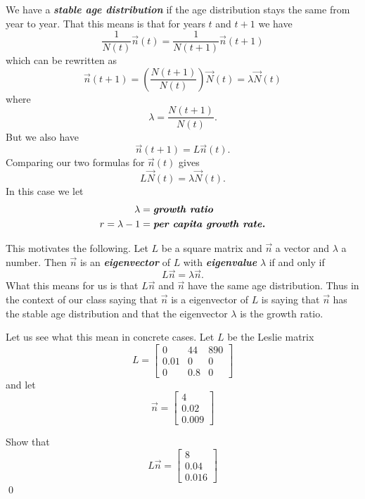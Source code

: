 \documentclass[11pt]{amsart}
\newcommand{\bi}[1]{{\bf\itshape #1\/}}  %
\renewcommand{\(}{\left(}
\renewcommand{\)}{\right)}
\renewcommand{\[}{\left[}
\renewcommand{\]}{\right]}
\theoremstyle{definition}
\theoremstyle{remark}
\newcounter{ProbCount}
\newcommand{\prob}{\stepcounter{ProbCount}
{\noindent{\bf \arabic{ProbCount}.} }}
\begin{document}
We have a \bi{stable age distribution} if the age distribution stays the same from year to year.  
That this means is that for years $t$ and $t+1$ we have
$$
\frac{1}{N(t)}\vec n(t)=
\frac{1}{N(t+1)}\vec n(t+1)
$$
which can be rewritten as
$$
\vec n(t+1)= \(\frac{N(t+1)}{N(t)}\)\vec N(t)=\lambda \vec N(t)
$$
where
$$
\lambda = \frac{N(t+1)}{N(t)}.
$$
But we also have
$$
\vec  n(t+1) = L \vec n(t).
$$
Comparing our two formulas for $\vec n(t)$ gives
$$
L \vec N(t) = \lambda \vec N(t).
$$
In this case we let
\begin{align*}
	\lambda&= \text{\bi{growth ratio}}\\
	r = \lambda-1 & = \text{\bi{per capita growth rate.}}
\end{align*}
\bigskip

This motivates the following.
Let $L$ be a square matrix and $\vec n$ a vector and $\lambda$ a number.  Then $\vec n$ is
an \bi{eigenvector} of $L$ with \bi{eigenvalue} $\lambda$ if and only 
if 
$$
L \vec n = \lambda \vec n.
$$
What this means for us is that $L \vec n$ and $\vec n$ have the same age distribution.
Thus in the context of our class saying that $\vec n$ is a eigenvector of $L$ is
saying that $\vec n$ has the stable age distribution and that the eigenvector $\lambda$
is the growth ratio.



Let us see what this mean in concrete cases.  Let $L$ be the Leslie matrix
$$
L = \[ \begin{matrix}
0&44&  890\\
0.01 & 0& 0 \\
0& 0.8& 0
\end{matrix}\]
$$
and let
$$
\vec n = \[ \begin{matrix}
4\\ 0.02\\ 0.009
\end{matrix}\]
$$

\prob Show that
$$
L\vec n = \[ \begin{matrix}
8\\ 0.04\\ 0.016
\end{matrix}\]
$$
\qed
\end{document}
